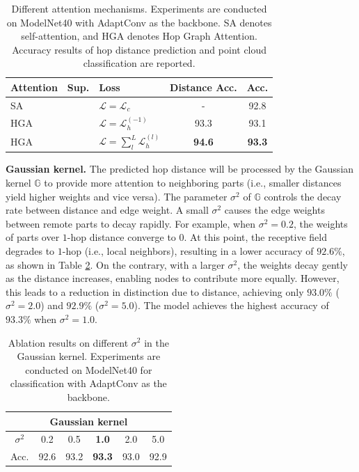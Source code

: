 \documentclass[letterpaper]{article}
\newcommand{\cmark}{\ding{51}}
\newcommand{\xmark}{\ding{55}}
\begin{document}
\setlength{\tabcolsep}{4pt}
\begin{table}
\begin{center}
\begin{tabular}{l c l c c}
\hline
Attention & Sup. & Loss & Distance Acc. & Acc.\\
\hline
SA & \cmark & $\mathcal{L} = \mathcal{L}_c $ & - & 92.8\\
HGA & \xmark & $\mathcal{L} = \mathcal{L}_h^{(-1)}$ & 93.3 & 93.1\\
HGA & \xmark & $\mathcal{L} = \sum_{l}^{L}\mathcal{L}_h^{(l)}$ & \bf{94.6} & \bf{93.3}\\
\hline
\end{tabular}
\end{center}
\caption{
Different attention mechanisms. Experiments are conducted on ModelNet40 with AdaptConv as the backbone.
SA denotes self-attention, and HGA denotes Hop Graph Attention.
Accuracy results of hop distance prediction and point cloud classification are reported.
}
\label{table:attention}
\end{table}


\textbf{Gaussian kernel.}
The predicted hop distance will be processed by the Gaussian kernel \(\mathbb{G}\) to provide more attention to neighboring parts (i.e., smaller distances yield higher weights and vice versa).
The parameter \(\sigma^2\) of \(\mathbb{G}\) controls the decay rate between distance and edge weight.
A small \(\sigma^2\) causes the edge weights between remote parts to decay rapidly.
For example, when \(\sigma^2=0.2\), the weights of parts over \(1\)-hop distance converge to $0$. At this point, the receptive field degrades to $1$-hop (i.e., local neighbors), resulting in a lower accuracy of $92.6\%$, as shown in Table \ref{table:ablation}.
On the contrary, with a larger $\sigma^2$, the weights decay gently as the distance increases, enabling nodes to contribute more equally.
However, this leads to a reduction in distinction due to distance, achieving only $93.0\%$ ($\sigma^2=2.0$) and $92.9\%$ ($\sigma^2=5.0$).
The model achieves the highest accuracy of $93.3\%$ when $\sigma^2=1.0$.


\begin{table}
\begin{center}
\begin{adjustbox}{width=0.59\columnwidth}
\begin{tabular}{c| c c c c c}
\hline
\multicolumn{6}{c}{Gaussian kernel}\\
\hline
$\sigma^2$ & 0.2 & 0.5 & \textbf{1.0} & 2.0 & 5.0\\
Acc. & 92.6 & 93.2 & \textbf{93.3} & 93.0 & 92.9 \\
\hline
\end{tabular}
\end{adjustbox}
\end{center}
\caption{Ablation results on different \(\sigma^2\) in the Gaussian kernel. Experiments are conducted on ModelNet40 for classification with AdaptConv as the backbone.}
\label{table:ablation}
\end{table}
\end{document}
